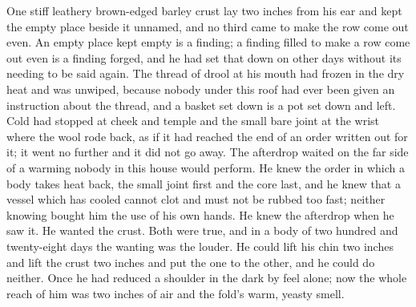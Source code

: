 One stiff leathery brown-edged barley crust lay two inches from his ear and kept the empty place beside it unnamed, and no third came to make the row come out even. An empty place kept empty is a finding; a finding filled to make a row come out even is a finding forged, and he had set that down on other days without its needing to be said again. The thread of drool at his mouth had frozen in the dry heat and was unwiped, because nobody under this roof had ever been given an instruction about the thread, and a basket set down is a pot set down and left. Cold had stopped at cheek and temple and the small bare joint at the wrist where the wool rode back, as if it had reached the end of an order written out for it; it went no further and it did not go away. The afterdrop waited on the far side of a warming nobody in this house would perform. He knew the order in which a body takes heat back, the small joint first and the core last, and he knew that a vessel which has cooled cannot clot and must not be rubbed too fast; neither knowing bought him the use of his own hands. He knew the afterdrop when he saw it. He wanted the crust. Both were true, and in a body of two hundred and twenty-eight days the wanting was the louder. He could lift his chin two inches and lift the crust two inches and put the one to the other, and he could do neither. Once he had reduced a shoulder in the dark by feel alone; now the whole reach of him was two inches of air and the fold's warm, yeasty smell.

\scenebreak

